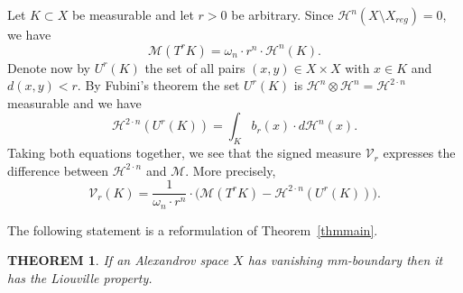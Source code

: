 \documentclass[12pt,leqno,intlimits]{amsart}
\numberwithin{equation}{section}
\newtheorem{thm}{THEOREM}[section]
\theoremstyle{definition}
\theoremstyle{remark}
\newcommand{\tref}[1]{Theorem~\ref{#1}}
\begin{document}
Let $K\subset X$ be measurable and let $r>0$ be arbitrary.
Since $\mathcal H^n (X\setminus X_{reg} )=0$, we have
$$\mathcal M (T^{r} K) =\omega _n \cdot r^n \cdot \mathcal H^n (K).$$
Denote now by $U^r(K)$
the set of all pairs $(x,y)\in X\times X$ with $x\in K$ and $d(x,y)<r$.
By Fubini's theorem the set $U^r(K)$ is $\mathcal H^n \otimes \mathcal H^n =\mathcal H^{2\cdot n}$ measurable and we have
$$\mathcal H^{2\cdot n} (U^r (K))= \int _K b_r (x) \cdot d\mathcal H^n (x). $$
Taking both equations together, we see that the signed measure $\mathcal{V}_r$ expresses the difference between $\mathcal H^{2\cdot n}$ and $\mathcal M$. More precisely,
\begin{equation} \label{eq:compare}
\mathcal{V}_r (K) = \frac 1 {\omega_n \cdot r^n}\cdot \Big(\mathcal M (T^r K)- \mathcal H^{2\cdot n} (U^r (K)) \Big).
\end{equation}

The following statement is a reformulation of \tref{thmmain}.

\begin{thm} \label{reform}
If an Alexandrov space $X$ has vanishing  mm-boundary then it has the Liouville property.
\end{thm}
\end{document}
